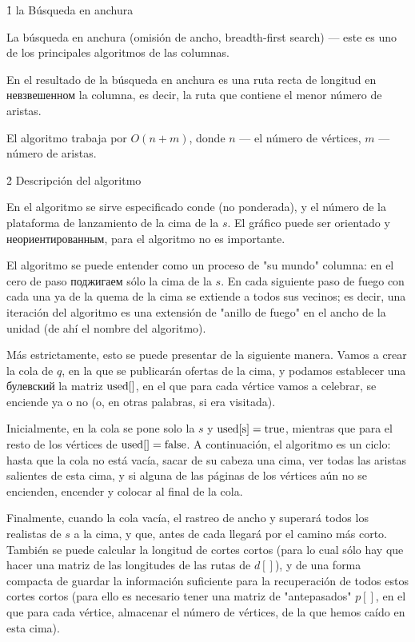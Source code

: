 \h1{ la Búsqueda en anchura }

La búsqueda en anchura (omisión de ancho, breadth-first search) --- este es uno de los principales algoritmos de las columnas.

En el resultado de la búsqueda en anchura es una ruta recta de longitud en невзвешенном la columna, es decir, la ruta que contiene el menor número de aristas.

El algoritmo trabaja por $O (n+m)$, donde $n$ --- el número de vértices, $m$ --- número de aristas.


\h2{ Descripción del algoritmo }

En el algoritmo se sirve especificado conde (no ponderada), y el número de la plataforma de lanzamiento de la cima de la $s$. El gráfico puede ser orientado y неориентированным, para el algoritmo no es importante.

El algoritmo se puede entender como un proceso de "su mundo" columna: en el cero de paso поджигаем sólo la cima de la $s$. En cada siguiente paso de fuego con cada una ya de la quema de la cima se extiende a todos sus vecinos; es decir, una iteración del algoritmo es una extensión de "anillo de fuego" en el ancho de la unidad (de ahí el nombre del algoritmo).

Más estrictamente, esto se puede presentar de la siguiente manera. Vamos a crear la cola de $q$, en la que se publicarán ofertas de la cima, y podamos establecer una булевский la matriz $\rm used[]$, en el que para cada vértice vamos a celebrar, se enciende ya o no (o, en otras palabras, si era visitada).

Inicialmente, en la cola se pone solo la $s$ y $\rm used[s] = true$, mientras que para el resto de los vértices de $\rm used[] = false$. A continuación, el algoritmo es un ciclo: hasta que la cola no está vacía, sacar de su cabeza una cima, ver todas las aristas salientes de esta cima, y si alguna de las páginas de los vértices aún no se encienden, encender y colocar al final de la cola.

Finalmente, cuando la cola vacía, el rastreo de ancho y superará todos los realistas de $s$ a la cima, y que, antes de cada llegará por el camino más corto. También se puede calcular la longitud de cortes cortos (para lo cual sólo hay que hacer una matriz de las longitudes de las rutas de $d[]$), y de una forma compacta de guardar la información suficiente para la recuperación de todos estos cortes cortos (para ello es necesario tener una matriz de "antepasados" $p[]$, en el que para cada vértice, almacenar el número de vértices, de la que hemos caído en esta cima).


